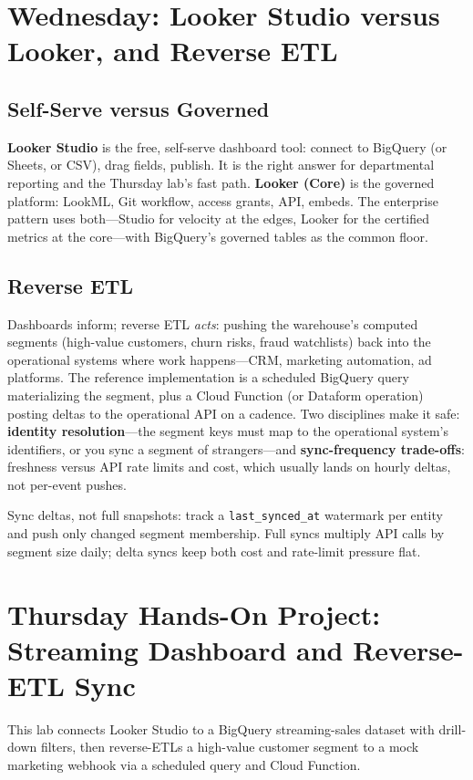 \section{Wednesday: Looker Studio versus Looker, and Reverse ETL}

\subsection{Self-Serve versus Governed}
\textbf{Looker Studio} is the free, self-serve dashboard tool: connect to BigQuery (or Sheets, or CSV), drag fields, publish. It is the right answer for departmental reporting and the Thursday lab's fast path. \textbf{Looker (Core)} is the governed platform: LookML, Git workflow, access grants, API, embeds. The enterprise pattern uses both---Studio for velocity at the edges, Looker for the certified metrics at the core---with BigQuery's governed tables as the common floor.

\subsection{Reverse ETL}
Dashboards inform; reverse ETL \emph{acts}: pushing the warehouse's computed segments (high-value customers, churn risks, fraud watchlists) back into the operational systems where work happens---CRM, marketing automation, ad platforms. The reference implementation is a scheduled BigQuery query materializing the segment, plus a Cloud Function (or Dataform operation) posting deltas to the operational API on a cadence. Two disciplines make it safe: \textbf{identity resolution}---the segment keys must map to the operational system's identifiers, or you sync a segment of strangers---and \textbf{sync-frequency trade-offs}: freshness versus API rate limits and cost, which usually lands on hourly deltas, not per-event pushes.

\begin{tipbox}
Sync deltas, not full snapshots: track a \texttt{last\_synced\_at} watermark per entity and push only changed segment membership. Full syncs multiply API calls by segment size daily; delta syncs keep both cost and rate-limit pressure flat.
\end{tipbox}

\section{Thursday Hands-On Project: Streaming Dashboard and Reverse-ETL Sync}
This lab connects Looker Studio to a BigQuery streaming-sales dataset with drill-down filters, then reverse-ETLs a high-value customer segment to a mock marketing webhook via a scheduled query and Cloud Function.

